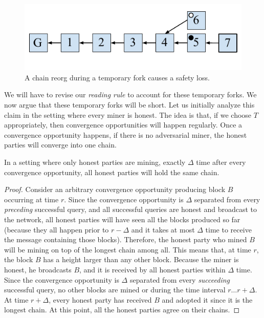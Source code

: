 \begin{figure}[h]
    \centering
    \includegraphics[width=0.5 \columnwidth,keepaspectratio]{figures/reorg-safety-loss.pdf}
    \caption{A chain reorg during a temporary fork causes a safety loss.}
    \label{fig.reorg-safety-loss}
\end{figure}

We will have to revise our \emph{reading rule} to account for these temporary forks. We now argue that these
temporary forks will be short. Let us initially analyze this claim in the setting where every miner is honest.
The idea is that, if we choose $T$ appropriately, then convergence opportunities will happen regularly.
Once a convergence opportunity happens, if there is no adversarial miner, the honest parties will converge into
one chain.

\begin{lemma}\label{lem:honest-convergence}
    In a setting where only honest parties are mining, exactly $\Delta$ time after every convergence
    opportunity, all honest parties will hold the same chain.
\end{lemma}
\begin{proof}
    Consider an arbitrary convergence opportunity producing block $B$ occurring at time $r$.
    Since the convergence opportunity is $\Delta$ separated from every \emph{preceding} successful query,
    and all successful queries are honest and broadcast to the network, all honest parties will
    have seen all the blocks produced so far (because they all happen prior to $r - \Delta$ and it
    takes at most $\Delta$ time to receive the message containing those blocks).
    Therefore, the honest party who mined $B$
    will be mining on top of the longest chain among all. This means
    that, at time $r$, the block $B$ has a height larger than any other
    block. Because the miner is honest, he broadcasts $B$, and it is received by all honest parties within $\Delta$
    time. Since the convergence opportunity is $\Delta$ separated from every \emph{succeeding} successful
    query, no other blocks are mined or during the time interval $r \ldots r + \Delta$.
    At time $r + \Delta$, every honest party has received $B$ and adopted it since it is
    the longest chain. At this point, all the honest parties agree on their chains.
\end{proof}

